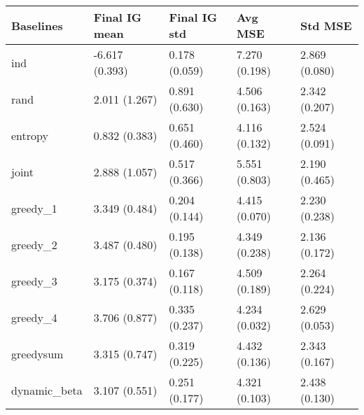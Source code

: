\begin{tabular}{lllll}
\toprule
    Baselines &   Final IG mean &   Final IG std &        Avg MSE &        Std MSE \\
\midrule
          ind &  -6.617 (0.393) &  0.178 (0.059) &  7.270 (0.198) &  2.869 (0.080) \\
         rand &   2.011 (1.267) &  0.891 (0.630) &  4.506 (0.163) &  2.342 (0.207) \\
      entropy &   0.832 (0.383) &  0.651 (0.460) &  4.116 (0.132) &  2.524 (0.091) \\
        joint &   2.888 (1.057) &  0.517 (0.366) &  5.551 (0.803) &  2.190 (0.465) \\
     greedy\_1 &   3.349 (0.484) &  0.204 (0.144) &  4.415 (0.070) &  2.230 (0.238) \\
     greedy\_2 &   3.487 (0.480) &  0.195 (0.138) &  4.349 (0.238) &  2.136 (0.172) \\
     greedy\_3 &   3.175 (0.374) &  0.167 (0.118) &  4.509 (0.189) &  2.264 (0.224) \\
     greedy\_4 &   3.706 (0.877) &  0.335 (0.237) &  4.234 (0.032) &  2.629 (0.053) \\
    greedysum &   3.315 (0.747) &  0.319 (0.225) &  4.432 (0.136) &  2.343 (0.167) \\
 dynamic\_beta &   3.107 (0.551) &  0.251 (0.177) &  4.321 (0.103) &  2.438 (0.130) \\
\bottomrule
\end{tabular}
